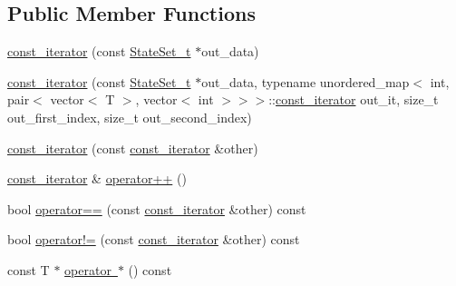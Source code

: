 \subsection*{Public Member Functions}
\begin{DoxyCompactItemize}
\item 
\mbox{\hyperlink{classgraphsat_1_1_state_set_1_1const__iterator_a0ef15f55d1a11cebb203d15a1f743460}{const\+\_\+iterator}} (const \mbox{\hyperlink{classgraphsat_1_1_state_set_a6474a59203fade7146aacfd0e277ecf4}{State\+Set\+\_\+t}} $\ast$out\+\_\+data)
\item 
\mbox{\hyperlink{classgraphsat_1_1_state_set_1_1const__iterator_acbeaca441a996278c065901779eeab12}{const\+\_\+iterator}} (const \mbox{\hyperlink{classgraphsat_1_1_state_set_a6474a59203fade7146aacfd0e277ecf4}{State\+Set\+\_\+t}} $\ast$out\+\_\+data, typename unordered\+\_\+map$<$ int, pair$<$ vector$<$ T $>$, vector$<$ int $>$$>$$>$\+::\mbox{\hyperlink{classgraphsat_1_1_state_set_1_1const__iterator}{const\+\_\+iterator}} out\+\_\+it, size\+\_\+t out\+\_\+first\+\_\+index, size\+\_\+t out\+\_\+second\+\_\+index)
\item 
\mbox{\hyperlink{classgraphsat_1_1_state_set_1_1const__iterator_a6953626600d24392b3fdcdd3dffefbf0}{const\+\_\+iterator}} (const \mbox{\hyperlink{classgraphsat_1_1_state_set_1_1const__iterator}{const\+\_\+iterator}} \&other)
\item 
\mbox{\hyperlink{classgraphsat_1_1_state_set_1_1const__iterator}{const\+\_\+iterator}} \& \mbox{\hyperlink{classgraphsat_1_1_state_set_1_1const__iterator_aebd760173617e51a4b4831140c43001c}{operator++}} ()
\item 
bool \mbox{\hyperlink{classgraphsat_1_1_state_set_1_1const__iterator_af6c6f17f160d8dd538dfeb3b3f3e76e6}{operator==}} (const \mbox{\hyperlink{classgraphsat_1_1_state_set_1_1const__iterator}{const\+\_\+iterator}} \&other) const
\item 
bool \mbox{\hyperlink{classgraphsat_1_1_state_set_1_1const__iterator_a429d2b7fa1741bd7434a06087aae8b47}{operator!=}} (const \mbox{\hyperlink{classgraphsat_1_1_state_set_1_1const__iterator}{const\+\_\+iterator}} \&other) const
\item 
const T $\ast$ \mbox{\hyperlink{classgraphsat_1_1_state_set_1_1const__iterator_a41aad9be6b5c0347976b271f4863edb1}{operator $\ast$}} () const
\end{DoxyCompactItemize}
